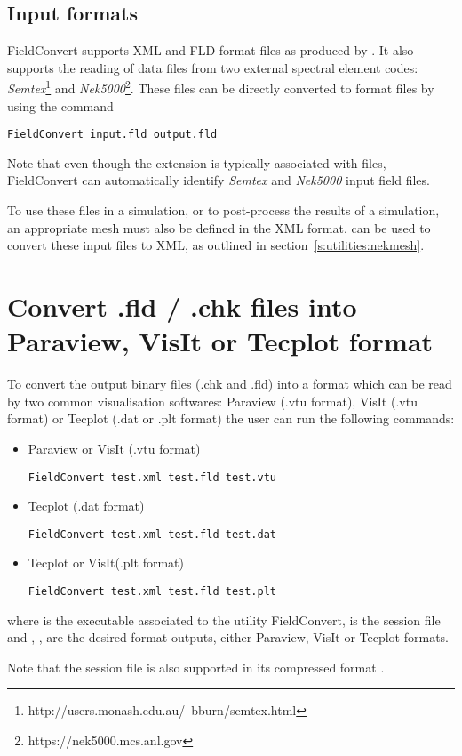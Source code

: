 \subsection{Input formats}

FieldConvert supports XML and FLD-format files as produced by \nekpp. It also
supports the reading of data files from two external spectral element codes:
\emph{Semtex}\footnote{http://users.monash.edu.au/~bburn/semtex.html} and
\emph{Nek5000}\footnote{https://nek5000.mcs.anl.gov}. These files can be
directly converted to \nekpp format files by using the command
%
\begin{lstlisting}[style=BashInputStyle]
  FieldConvert input.fld output.fld
\end{lstlisting}
%
Note that even though the  extension is typically associated with
\nekpp files, FieldConvert can automatically identify \emph{Semtex} and
\emph{Nek5000} input field files.

To use these files in a simulation, or to post-process the results of a
simulation, an appropriate mesh must also be defined in the \nekpp XML format.
\nm can be used to convert these input files to XML, as outlined in
section~\ref{s:utilities:nekmesh}.

\section{Convert .fld / .chk files into Paraview, VisIt or Tecplot format}
\label{s:utilities:fieldconvert:sub:convert}
To convert the \nekpp output binary files (.chk and .fld) into a
format which can be read by two common visualisation softwares:
Paraview (.vtu format), VisIt (.vtu format) or Tecplot (.dat or .plt format)
the user can run the following commands:
%
\begin{itemize}
\item Paraview or VisIt (.vtu format)
%
\begin{lstlisting}[style=BashInputStyle]
FieldConvert test.xml test.fld test.vtu
\end{lstlisting}
%
\item Tecplot (.dat format)
%
\begin{lstlisting}[style=BashInputStyle]
FieldConvert test.xml test.fld test.dat
\end{lstlisting}
%
\item Tecplot or VisIt(.plt format)
%
\begin{lstlisting}[style=BashInputStyle]
FieldConvert test.xml test.fld test.plt
\end{lstlisting}
\end{itemize}
%
where  is the executable associated to the utility
FieldConvert,  is the session file and
, ,   are the desired
format outputs, either Paraview, VisIt or Tecplot formats.
%
\begin{tipbox}
Note that the session file is also supported
in its compressed format .
\end{tipbox}
%
%
%
